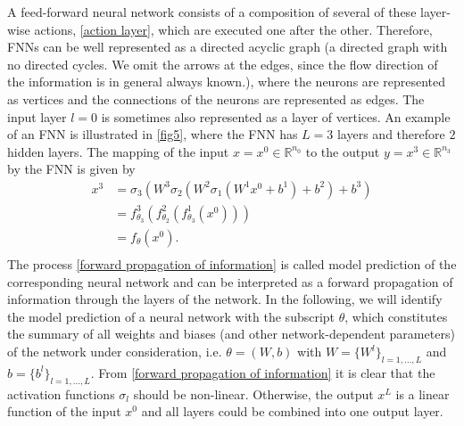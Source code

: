 A feed-forward neural network consists of a composition of several of these layer-wise actions, \cref{action layer}, which are executed one after the other. Therefore, FNNs can be well represented as a directed acyclic graph (a directed graph with no directed cycles. We omit the arrows at the edges, since the flow direction of the information is in general always known.), where the neurons are represented as vertices and the connections of the neurons are represented as edges. The input layer $l=0$ is sometimes also represented as a layer of vertices. An example of an FNN is illustrated in \cref{fig5}, where the FNN has $L=3$ layers and therefore $2$ hidden layers. The mapping of the input $x = x^0 \in \mathbb{R}^{n_0}$ to the output $y = x^3 \in \mathbb{R}^{n_3}$ by the FNN is given by 
\begin{equation}
    \label{forward propagation of information}
    \begin{aligned}
        x^3 &=\sigma_{3} \left( W^{3} \sigma_{2} \left(  W^{2} \sigma_{1} \left( W^{1} x^{0}+b^{1}\right)+b^{2}\right)+b^{3}\right) \\
        & =f^{3}_{\theta_3} \left( f^{2}_{\theta_2} \left( f^{1}_{\theta_3} \left(x^{0} \right) \right) \right) \\
        & = f_{\theta} \left( x^{0}\right). \\
    \end{aligned}
\end{equation}
The process \cref{forward propagation of information} is called model prediction of the corresponding neural network and can be interpreted as a forward propagation of information through the layers of the network. In the following, we will identify the model prediction of a neural network with the subscript $\theta$, which constitutes the summary of all weights and biases (and other network-dependent parameters) of the network under consideration, i.e. $\theta = (W,b)$ with $W = \{ W^l \}_{l = 1, \ldots, L}$ and $b = \{ b^l \}_{l = 1, \ldots, L}$. From \cref{forward propagation of information} it is clear that the activation functions $\sigma_l$ should be non-linear. Otherwise, the output $x^L$ is a linear function of the input $x^0$ and all layers could be combined into one output layer. \\

